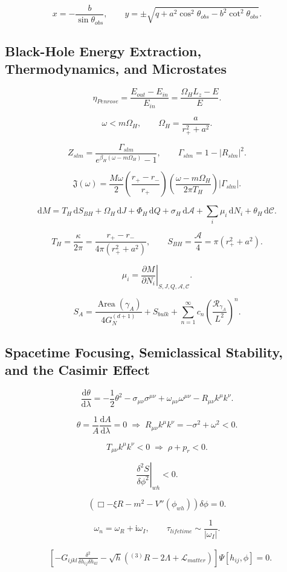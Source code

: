 \documentclass[11pt,a4paper]{article}
\newcommand{\R}{\mathcal{R}}
\newcommand{\A}{\mathcal{A}}
\newcommand{\C}{\mathcal{C}}
\newcommand{\Lag}{\mathcal{L}}
\newcommand{\Area}{\operatorname{Area}}
\newcommand{\dd}{\mathrm{d}}
\newcommand{\ii}{\mathrm{i}}
\begin{document}
\[
x=-\frac{b}{\sin\theta_{obs}},\qquad
y=\pm\sqrt{q+a^2\cos^2\theta_{obs}
-b^2\cot^2\theta_{obs}}.
\]

\subsection{Black-Hole Energy Extraction, Thermodynamics, and Microstates}

\[
\eta_{Penrose}=\frac{E_{out}-E_{in}}{E_{in}}
=\frac{\Omega_HL_z-E}{E}.
\]

\[
\omega<m\Omega_H,\qquad
\Omega_H=\frac{a}{r_+^2+a^2}.
\]

\[
Z_{slm}=\frac{\Gamma_{slm}}{e^{\beta_H(\omega-m\Omega_H)}-1},
\qquad
\Gamma_{slm}=1-|R_{slm}|^2.
\]

\[
\mathfrak{J}(\omega)
=\frac{M\omega}{2}\left(\frac{r_+-r_-}{r_+}\right)
\left(\frac{\omega-m\Omega_H}{2\pi T_H}\right)|\Gamma_{slm}|.
\]

\[
\dd M=T_H\,\dd S_{BH}+\Omega_H\,\dd J+\Phi_H\,\dd Q
+\sigma_H\,\dd\A+\sum_i\mu_i\,\dd N_i+\theta_H\,\dd\C.
\]

\[
T_H=\frac{\kappa}{2\pi}=\frac{r_+-r_-}{4\pi(r_+^2+a^2)},
\qquad
S_{BH}=\frac{\A}{4}=\pi(r_+^2+a^2).
\]

\[
\mu_i=\left.\frac{\partial M}{\partial N_i}\right|_{S,J,Q,\A,\C}.
\]

\[
S_A=\frac{\Area(\gamma_A)}{4G_N^{(d+1)}}+S_{bulk}
+\sum_{n=1}^{\infty}c_n\left(\frac{\R_{\gamma_A}}{L^2}\right)^n.
\]

\subsection{Spacetime Focusing, Semiclassical Stability, and the Casimir Effect}

\[
\frac{\dd\theta}{\dd\lambda}
=-\frac12\theta^2-\sigma_{\mu\nu}\sigma^{\mu\nu}
+\omega_{\mu\nu}\omega^{\mu\nu}-R_{\mu\nu}k^\mu k^\nu.
\]

\[
\theta=\frac1A\frac{\dd A}{\dd\lambda}=0
\;\Longrightarrow\;
R_{\mu\nu}k^\mu k^\nu=-\sigma^2+\omega^2<0.
\]

\[
T_{\mu\nu}k^\mu k^\nu<0
\;\Longrightarrow\;
\rho+p_r<0.
\]

\[
\left.\frac{\delta^2S}{\delta\phi^2}\right|_{wh}<0.
\]

\[
\left(\Box-\xi R-m^2-V''(\phi_{wh})\right)\delta\phi=0.
\]

\[
\omega_n=\omega_R+\ii\omega_I,\qquad
\tau_{lifetime}\sim\frac{1}{|\omega_I|}.
\]

\begin{align*}
&\left[-G_{ijkl}\frac{\delta^2}{\delta h_{ij}\delta h_{kl}}
-\sqrt{h}\left({}^{(3)}R-2\Lambda+\Lag_{matter}\right)\right]
\Psi[h_{ij},\phi]=0.
\end{align*}
\end{document}
